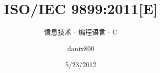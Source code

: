 \documentclass[cn,11pt,fancy,hide,normal]{elegantbook}
\title{ISO/IEC 9899:2011[E] }
\subtitle{信息技术 - 编程语言 - C}
\author{danix800}
\institute{ISO/IEC}
\date{5/23/2012}
\newcounter{excntr}
\newcounter{notescntr}
\newcommand{\chptr}[2]{
  \chapter{#1\label{#2}}
  \setcounter{excntr}{0}
  \setcounter{notescntr}{0}
}
\begin{document}
\maketitle
\tableofcontents


\mainmatter
\hypersetup{pageanchor=true}











\renewcommand{\thechapter}{\Alph{annexchptr}}
\renewcommand{\chaptername}{附录 \thechapter\;}
\renewcommand{\chptr}[2]{
  \stepcounter{annexchptr}
  \chapter{#1\label{#2}}
  \setcounter{excntr}{0}
  \setcounter{notescntr}{0}
}













\end{document}
